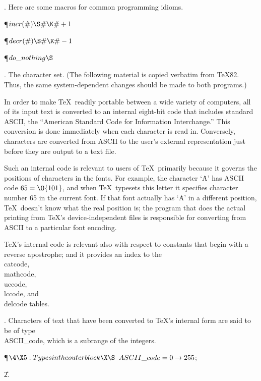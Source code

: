 . Here are some macros for common programming idioms.

\Y\P\D {}$\\{incr}(\#)\S\#\K\#+1$\par
\P\D {}$\\{decr}(\#)\S\#\K\#-1$\par
\P\D {}$\\{do\_nothing}\S$\par
\fi

.  The character set.
(The following material is copied verbatim from \TeX82.
Thus, the same system-dependent changes should be made to both programs.)

In order to make \TeX\ readily portable between a wide variety of
computers, all of its input text is converted to an internal eight-bit
code that includes standard ASCII, the ``American Standard Code for
Information Interchange.''  This conversion is done immediately when each
character is read in. Conversely, characters are converted from ASCII to
the user's external representation just before they are output to a
text file.

Such an internal code is relevant to users of \TeX\ primarily because it
governs the positions of characters in the fonts. For example, the
character `\.A' has ASCII code $65=\O{101}$, and when \TeX\ typesets
this letter it specifies character number 65 in the current font.
If that font actually has `\.A' in a different position, \TeX\ doesn't
know what the real position is; the program that does the actual printing from
\TeX's device-independent files is responsible for converting from ASCII to
a particular font encoding.

\TeX's internal code is relevant also with respect to constants
that begin with a reverse apostrophe; and it provides an index to the
\.{\\catcode}, \.{\\mathcode}, \.{\\uccode}, \.{\\lccode}, and \.{\\delcode}
tables.

\fi

. Characters of text that have been converted to \TeX's internal form
are said to be of type \\{ASCII\_code}, which is a subrange of the integers.

\Y\P$\4\X5:Types in the outer block\X\S$\6
$\\{ASCII\_code}=0\to255$;\par
\U2.\fi

